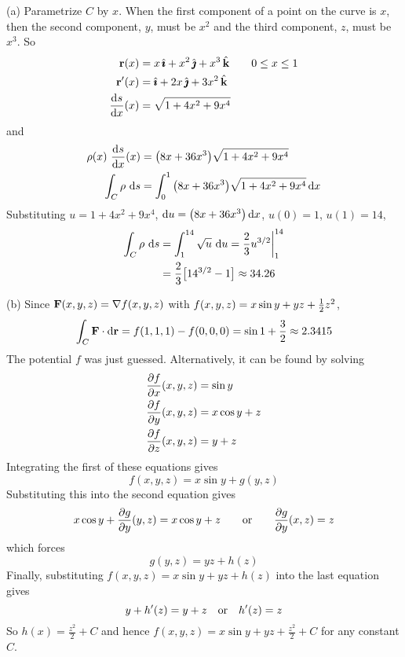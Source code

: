 \begin{solution}
(a) 
 Parametrize $C$ by $x$. When the first component of a point on the 
curve is $x$, then the second component, $y$, must be $x^2$ and 
the third component, $z$, must be $x^3$. So
\begin{align*}
\vr(x)&=x\,\hi+x^2\,\hj+x^3\,\hk\qquad 0\le x\le 1\\
\vr'(x)&=\hi+2x\,\hj+3x^2\,\hk\\
\diff{s}{x}(x)&=\sqrt{1+4x^2+9x^4}
\end{align*}
and
\begin{align*}
\rho(x)\ \diff{s}{x}(x)
&=\big(8x+36x^3\big)\sqrt{1+4x^2+9x^4}\\
\int_C\rho\ \dee{s}
&=\int_0^1 \big(8x+36x^3\big)\sqrt{1+4x^2+9x^4}\,\dee{x} 
\end{align*}
Substituting $u=1+4x^2+9x^4$, $\mathrm{d}u = \big(8x+36x^3\big)\,\mathrm{d}x$,
$u(0)=1$, $u(1)=14$,
\begin{align*}
\int_C\rho\ \mathrm{d}s
&=\int_1^{14} \sqrt{u}\ \mathrm{d}u
=\frac{2}{3}u^{3/2}\bigg|_1^{14}\\
&=\frac{2}{3}\big[14^{3/2}-1\big]\approx 34.26
\end{align*}

(b)
Since $\mathbf{F}(x,y,z)=\nabla f(x,y,z)$ with $f(x,y,z)=x\sin y+yz+\tfrac{1}{2} z^2$,
\begin{equation*}
\int_C \mathbf{F}\cdot \mathrm{d}\mathbf{r}=f(1,1,1)-f(0,0,0)
=\sin 1+\frac{3}{2} \approx 2.3415
\end{equation*}
The potential $f$ was just guessed. Alternatively, it can be found 
by solving
\begin{align*}
\pdiff{f}{x}(x,y,z) 
            &= \sin y \\
\pdiff{f}{y}(x,y,z) &= x\cos y+z \\
\pdiff{f}{z}(x,y,z) &= y+z
\end{align*}
Integrating the first of these equations gives
\begin{equation*}
f(x,y,z) = x\sin y +g(y,z)
\end{equation*}
Substituting this into the second equation gives 
\begin{equation*}
x\cos y+\frac{\partial g}{\partial y}(y,z) = x\cos y+z\qquad\hbox{or}\qquad
\frac{\partial g}{\partial y}(x,z)=z
\end{equation*}
which forces
\begin{equation*}
g(y,z) =  yz + h(z)
\end{equation*}
Finally, substituting $f(x,y,z) = x\sin y +yz + h(z)$
into the last equation gives
\begin{equation*}
y + h'(z)
=y+z \quad\hbox{or}\quad
h'(z) = z
\end{equation*}
So $h(x) = \frac{z^2}{2}+C$ and hence 
$f(x,y,z) = x\sin y + yz + \frac{z^2}{2}+C$  for any constant $C$.

\end{solution}

